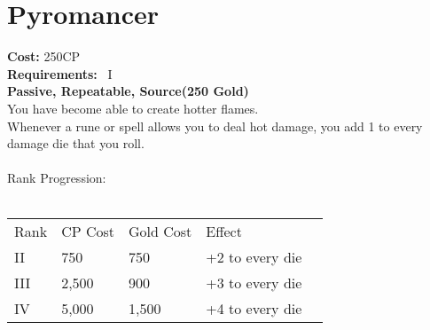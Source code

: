 \section{Pyromancer}\label{perk:pyromancer}
\textbf{Cost:} 250CP\\
\textbf{Requirements:}~ I\\
\textbf{Passive, Repeatable, Source(250 Gold)}\\
You have become able to create hotter flames.\\
Whenever a rune or spell allows you to deal hot damage, you add 1 to every damage die that you roll.\\
\\
Rank Progression:\\
\\
\begin{tabular}{l | l | l | l | l}
    Rank & CP Cost & Gold Cost &  Effect\\
    II & 750 & 750 & +2 to every die\\
    III & 2,500 & 900 & +3 to every die\\
    IV & 5,000 & 1,500 & +4 to every die\\
\end{tabular}
